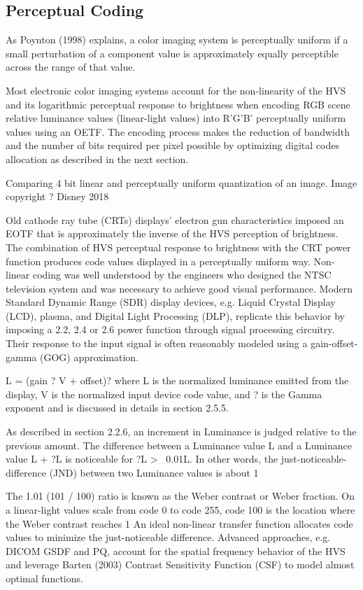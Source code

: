 \subsection{Perceptual Coding}%
\label{subsec:perceptual-coding}

As Poynton (1998) explains, a color imaging system is perceptually uniform if a small perturbation of a component value is approximately equally perceptible across the range of that value.

Most electronic color imaging systems account for the non-linearity of the HVS and its logarithmic perceptual response to brightness when encoding RGB scene relative luminance values (linear-light values) into R'G'B' perceptually uniform values using an OETF. The encoding process makes the reduction of bandwidth and the number of bits required per pixel possible by optimizing digital codes allocation as described in the next section.

Comparing 4 bit linear and perceptually uniform quantization of an image.
Image copyright ? Disney 2018

Old cathode ray tube (CRTs) displays' electron gun characteristics imposed an EOTF that is approximately the inverse of the HVS perception of brightness. The combination of HVS perceptual response to brightness with the CRT power function produces code values displayed in a perceptually uniform way. Non-linear coding was well understood by the engineers who designed the NTSC television system and was necessary to achieve good visual performance. Modern Standard Dynamic Range (SDR) display devices, e.g. Liquid Crystal Display (LCD), plasma, and Digital Light Processing (DLP), replicate this behavior by imposing a 2.2, 2.4 or 2.6 power function through signal processing circuitry. Their response to the input signal is often reasonably modeled using a gain-offset-gamma (GOG) approximation.

L = (gain ? V + offset)?
where L is the normalized luminance emitted from the display, V is the normalized input device code value, and ? is the Gamma exponent and is discussed in details in section 2.5.5.

As described in section 2.2.6, an increment in Luminance is judged relative to the previous amount. The difference between a Luminance value L and a Luminance value L + ?L is noticeable for ?L > ~0.01L. In other words, the just-noticeable-difference (JND) between two Luminance values is about 1%

The 1.01 (101 / 100) ratio is known as the Weber contrast or Weber fraction. On a linear-light values scale from code 0 to code 255, code 100 is the location where the Weber contrast reaches 1%
An ideal non-linear transfer function allocates code values to minimize the just-noticeable difference. Advanced approaches, e.g. DICOM GSDF and PQ, account for the spatial frequency behavior of the HVS and leverage Barten (2003) Contrast Sensitivity Function (CSF) to model almost optimal functions.


